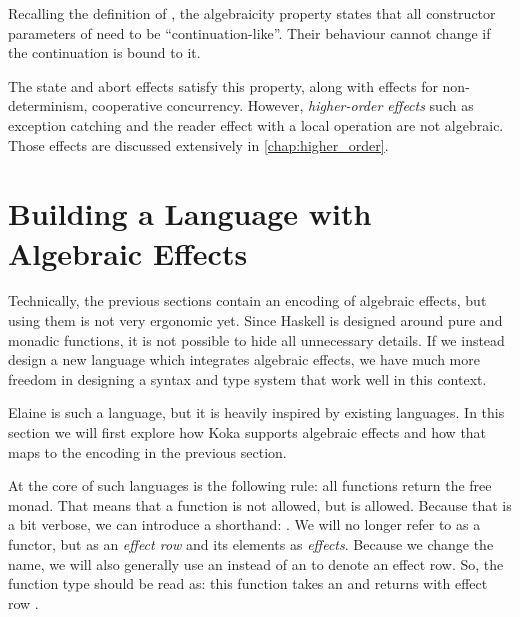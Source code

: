 
Recalling the definition of , the algebraicity property states that all constructor parameters of  need to be ``continuation-like''. Their behaviour cannot change if the continuation is bound to it.

The state and abort effects satisfy this property, along with effects for non-determinism, cooperative concurrency. However, \emph{higher-order effects} such as exception catching and the reader effect with a local operation are not algebraic. Those effects are discussed extensively in \cref{chap:higher_order}.

\section{Building a Language with Algebraic Effects}

Technically, the previous sections contain an encoding of algebraic effects, but using them is not very ergonomic yet. Since Haskell is designed around pure and monadic functions, it is not possible to hide all unnecessary details. If we instead design a new language which integrates algebraic effects, we have much more freedom in designing a syntax and type system that work well in this context.

Elaine is such a language, but it is heavily inspired by existing languages. In this section we will first explore how Koka \autocite{leijen_koka_2014,leijen_koka_2023} supports algebraic effects and how that maps to the encoding in the previous section.

At the core of such languages is the following rule: all functions return the free monad. That means that a function  is not allowed, but  is allowed. Because that is a bit verbose, we can introduce a shorthand: . We will no longer refer to  as a functor, but as an \emph{effect row} and its elements as \emph{effects}. Because we change the name, we will also generally use an  instead of an  to denote an effect row. So, the function type  should be read as: this function takes an  and returns  with effect row .

